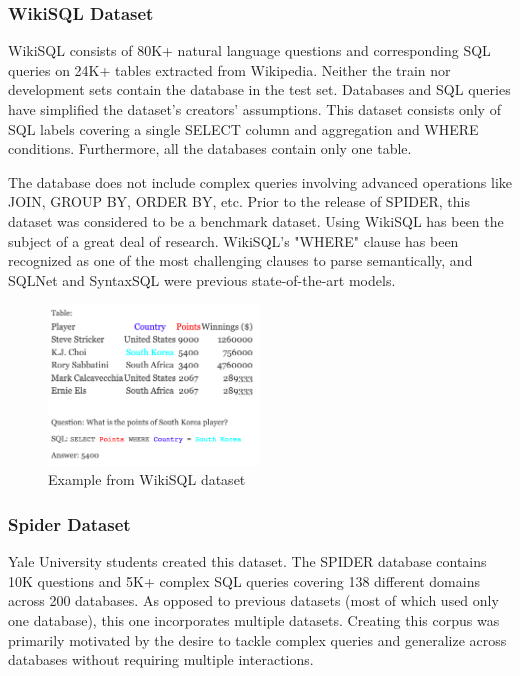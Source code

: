 \subsubsection{WikiSQL Dataset}

WikiSQL consists of 80K+ natural language questions and corresponding SQL queries on 24K+ tables extracted from Wikipedia. Neither the train nor development sets contain the database in the test set. Databases and SQL queries have simplified the dataset's creators' assumptions. This dataset consists only of SQL labels covering a single SELECT column and aggregation and WHERE conditions. Furthermore, all the databases contain only one table.

The database does not include complex queries involving advanced operations like JOIN, GROUP BY, ORDER BY, etc. Prior to the release of SPIDER, this dataset was considered to be a benchmark dataset. Using WikiSQL has been the subject of a great deal of research. WikiSQL's "WHERE" clause has been recognized as one of the most challenging clauses to parse semantically, and SQLNet and SyntaxSQL were previous state-of-the-art models.


\begin{figure}[htb]
    \centering
    \includegraphics[width=0.5\textwidth]{pics/db/WikiSQL.png}
    \caption{Example from WikiSQL dataset\cite{hwang_comprehensive_2019}}
    \label{fig:WikiSQL}
\end{figure}


\subsubsection{Spider Dataset}

Yale University students created this dataset.
The SPIDER database contains 10K questions and 5K+ complex SQL queries covering 138 different domains across 200 databases. As opposed to previous datasets (most of which used only one database), this one incorporates multiple datasets. Creating this corpus was primarily motivated by the desire to tackle complex queries and generalize across databases without requiring multiple interactions.

